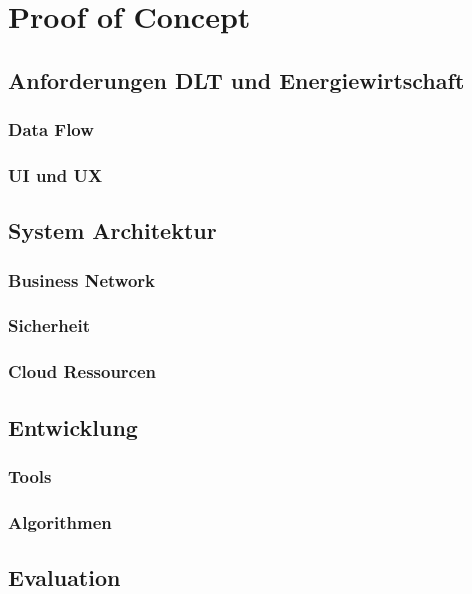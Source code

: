 \section{Proof of Concept}

\subsection{Anforderungen DLT und Energiewirtschaft}

\subsubsection{Data Flow}

\subsubsection{UI und UX}

\subsection{System Architektur}

\subsubsection{Business Network}

\subsubsection{Sicherheit}

\subsubsection{Cloud Ressourcen}

\subsection{Entwicklung}

\subsubsection{Tools}

\subsubsection{Algorithmen}

\subsection{Evaluation}

\newpage